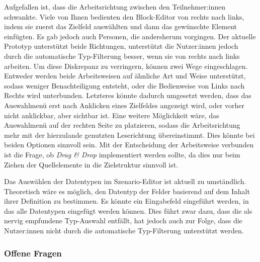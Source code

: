 Aufgefallen ist, dass die Arbeitsrichtung zwischen den Teilnehmer:innen schwankte. Viele von Ihnen bedienten den Block-Editor von rechts nach links, indem sie zuerst das Zielfeld auswählten und dann das gewünschte Element einfügten. Es gab jedoch auch Personen, die andersherum vorgingen. Der aktuelle Prototyp unterstützt beide Richtungen, unterstützt die Nutzer:innen jedoch durch die automatische Typ-Filterung besser, wenn sie von rechts nach links arbeiten. Um diese Diskrepanz zu verringern, können zwei Wege eingeschlagen. Entweder werden beide Arbeitsweisen auf ähnliche Art und Weise unterstützt, sodass weniger Benachteiligung entsteht, oder die Bedienweise von Links nach Rechts wird unterbunden. Letzteres könnte dadurch umgesetzt werden, dass das Auswahlmenü erst nach Anklicken eines Zielfeldes angezeigt wird, oder vorher nicht anklickbar, aber sichtbar ist. Eine weitere Möglichkeit wäre, das Auswahlmenü auf der rechten Seite zu platzieren, sodass die Arbeitsrichtung mehr mit der hierzulande genutzten Leserichtung übereinstimmt. Dies könnte bei beiden Optionen sinnvoll sein. Mit der Entscheidung der Arbeitsweise verbunden ist die Frage, ob \textit{Drag \& Drop} implementiert werden sollte, da dies nur beim Ziehen der Quellelemente in die Zielstruktur sinnvoll ist.

Das Auswählen der Datentypen im Szenario-Editor ist aktuell zu umständlich. Theoretisch wäre es möglich, den Datentyp der Felder basierend auf dem Inhalt ihrer Definition zu bestimmen. Es könnte ein Eingabefeld eingeführt werden, in das alle Datentypen eingefügt werden können. Dies führt zwar dazu, dass die als nervig empfundene Typ-Auswahl entfällt, hat jedoch auch zur Folge, dass die Nutzer:innen nicht durch die automatische Typ-Filterung unterstützt werden.


\subsubsection{Offene Fragen}

